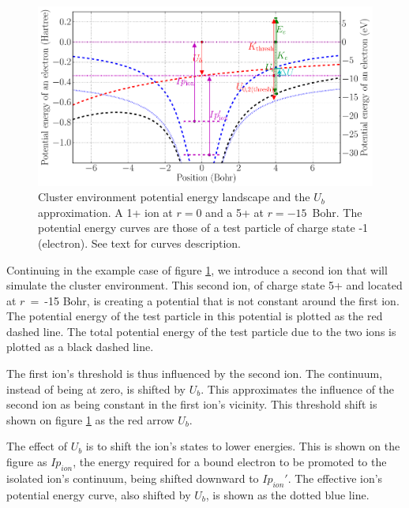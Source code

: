 \begin{figure}
    \begin{center}
    \includegraphics[width=0.98\columnwidth]{figures/potential_landscape}
    \end{center}
    \caption{\label{fig:md:Vb}Cluster environment potential energy landscape
             and the $U_b$ approximation. A 1+ ion at $r=0$ and a 5+ at
             $r=-15$~Bohr. The potential energy curves are those of a test
             particle of charge state -1 (electron). See text for curves
             description.}
\end{figure}


Continuing in the example case of figure \ref{fig:md:Vb}, we introduce a
second ion that will simulate the cluster environment. This second ion, of
charge state 5+ and located at $r$~=~-15 Bohr, is creating a
potential that is not constant around the first ion. The potential energy of
the test particle in this potential is plotted as the red dashed line. The total
potential energy of the test particle due to the two ions is plotted as a black
dashed line.

The first ion's threshold is thus influenced by the second ion. The continuum,
instead of being at zero, is shifted by $U_b$. This approximates the
influence of the second ion as being constant in the first ion's vicinity. This
threshold shift is shown on figure \ref{fig:md:Vb} as the red arrow $U_b$.

The effect of $U_b$ is to shift the ion's states to lower energies. This is
shown on the figure as $Ip_{ion}$, the energy required for a bound electron
to be promoted to the isolated ion's continuum, being shifted downward to
$Ip_{ion}'$. The effective ion's potential energy curve, also shifted by $U_b$,
is shown as the dotted blue line.

